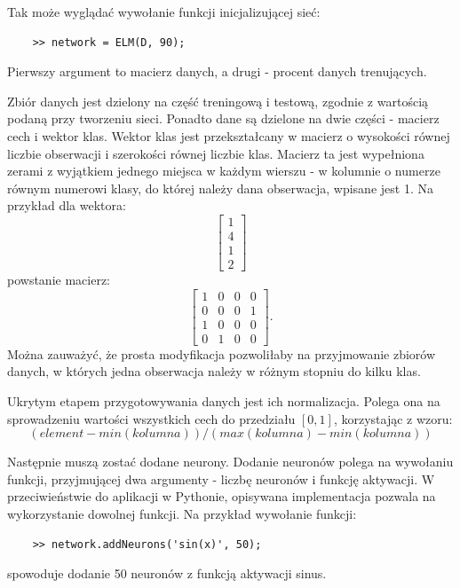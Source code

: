 \documentclass{article}
\begin{document}
Tak może wyglądać wywołanie funkcji inicjalizującej sieć:
\begin{lstlisting}
	>> network = ELM(D, 90);
\end{lstlisting}
Pierwszy argument to macierz danych, a drugi - procent danych trenujących.

Zbiór danych jest dzielony na część treningową i testową, zgodnie z wartością podaną przy tworzeniu sieci. 
Ponadto dane są dzielone na dwie części - macierz cech i wektor klas.
Wektor klas jest przekształcany w macierz o wysokości równej liczbie obserwacji i szerokości równej liczbie klas.
Macierz ta jest wypełniona zerami z wyjątkiem jednego miejsca w każdym wierszu - w kolumnie o numerze równym numerowi klasy, do której należy dana obserwacja, wpisane jest 1.
Na przykład dla wektora:
\[ \begin{bmatrix} 1 \\ 4 \\ 1 \\ 2 \end{bmatrix}\]
powstanie macierz:
\[ \begin{bmatrix} 1&0&0&0 \\ 0&0&0&1 \\ 1&0&0&0 \\ 0&1&0&0 \end{bmatrix}.\]
Można zauważyć, że prosta modyfikacja pozwoliłaby na przyjmowanie zbiorów danych, w których jedna obserwacja należy w różnym stopniu do kilku klas.

Ukrytym etapem przygotowywania danych jest ich normalizacja. 
Polega ona na sprowadzeniu wartości wszystkich cech do przedziału $[0, 1]$, korzystając z wzoru:
\[(element - min(kolumna))/(max(kolumna) - min(kolumna))\]

Następnie muszą zostać dodane neurony.
Dodanie neuronów polega na wywołaniu funkcji, przyjmującej dwa argumenty - liczbę neuronów i funkcję aktywacji.
W przeciwieństwie do aplikacji w Pythonie, opisywana implementacja pozwala na wykorzystanie dowolnej funkcji.
Na przykład wywołanie funkcji:
\begin{lstlisting}
	>> network.addNeurons('sin(x)', 50);
\end{lstlisting}
spowoduje dodanie 50 neuronów z funkcją aktywacji sinus.
\end{document}
